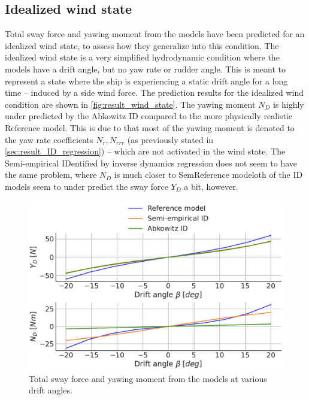 \subsection{Idealized wind state}
Total sway force and yawing moment from the models have been predicted for an idealized wind state, to assess how they generalize into this condition.
The idealized wind state is a very simplified hydrodynamic condition where the models have a drift angle, but no yaw rate or rudder angle. This is meant to represent a state where the ship is experiencing a static drift angle for a long time -- induced by a side wind force.
The prediction results for the idealized wind condition are shown in \autoref{fig:result_wind_state}. The yawing moment $N_D$ is highly under predicted by the Abkowitz ID compared to the more physically realistic Reference model. This is due to that most of the yawing moment is denoted to the yaw rate coefficients $N_r,N_{rrr}$ (as previously stated in \autoref{sec:result_ID_regression}) -- which are not activated in the wind state. The Semi-empirical IDentified by inverse dynamics regression does not seem to have the same problem, where $N_D$ is much closer to SemReference modeloth of the ID models seem to under predict the sway force $Y_D$ a bit, however.
\label{sec:wind_state}
\begin{figure}[h!]
    \includegraphics[width=\columnwidth]{figures/result_wind_state.forces.pdf}
    \caption{Total sway force and yawing moment from the models at various drift angles.}
    \label{fig:result_wind_state}
\end{figure}
